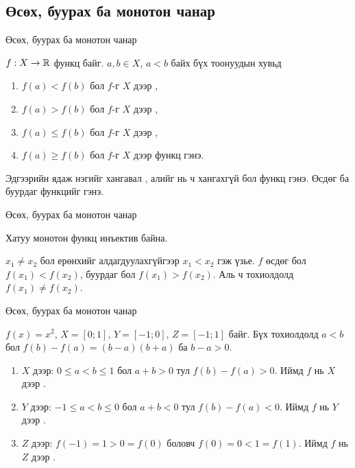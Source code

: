 \subsection{Өсөх, буурах ба монотон чанар}
\begin{frame}[allowframebreaks]{Өсөх, буурах ба монотон чанар}
\begin{definition}
$f:X\to\mathbb{R}$ функц байг. $a,b\in X$, $a<b$ байх бүх тоонуудын хувьд
\begin{enumerate}
  \item $f(a)<f(b)$ бол $f$-г $X$ дээр ,
  \item $f(a)>f(b)$ бол $f$-г $X$ дээр ,
  \item $f(a)\le f(b)$ бол $f$-г $X$ дээр ,
  \item $f(a)\ge f(b)$ бол $f$-г $X$ дээр  функц гэнэ.
\end{enumerate}
Эдгээрийн ядаж нэгийг хангавал , алийг нь ч хангахгүй бол
 функц гэнэ. Өсдөг ба буурдаг функцийг  гэнэ.
\end{definition}
\end{frame}

\begin{frame}[allowframebreaks]{Өсөх, буурах ба монотон чанар}
\begin{theorem}
Хатуу монотон функц инъектив байна.
\end{theorem}
\begin{prof}
$x_1\neq x_2$ бол ерөнхийг алдагдуулахгүйгээр $x_1<x_2$ гэж үзье. $f$ өсдөг бол
$f(x_1)<f(x_2)$, буурдаг бол $f(x_1)>f(x_2)$. Аль ч тохиолдолд $f(x_1)\neq f(x_2)$.
\end{prof}
\end{frame}

\begin{frame}[allowframebreaks]{Өсөх, буурах ба монотон чанар}
\begin{example}
$f(x)=x^2$, \; $X=[0;1]$, \; $Y=[-1;0]$, \; $Z=[-1;1]$ байг. Бүх тохиолдолд
$a<b$ бол $f(b)-f(a)=(b-a)(b+a)$ ба $b-a>0$.
\begin{enumerate}
  \item $X$ дээр: $0\le a<b\le1$ бол $a+b>0$ тул $f(b)-f(a)>0$. Иймд $f$ нь $X$ дээр .
  \item $Y$ дээр: $-1\le a<b\le0$ бол $a+b<0$ тул $f(b)-f(a)<0$. Иймд $f$ нь $Y$ дээр .
  \item $Z$ дээр: $f(-1)=1>0=f(0)$ боловч $f(0)=0<1=f(1)$. Иймд $f$ нь $Z$ дээр .
\end{enumerate}
\end{example}
\end{frame}

